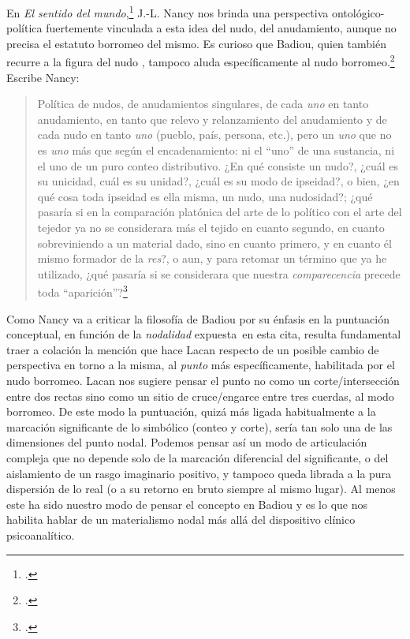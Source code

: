 En \emph{El sentido del mundo},\footcite{@7011-NANCY1993} J.-L. Nancy nos brinda una perspectiva ontológico-política fuertemente vinculada a esta idea del nudo, del anudamiento, aunque no precisa el estatuto borromeo del mismo. Es curioso que Badiou, quien también recurre a la figura del nudo , tampoco aluda específicamente al nudo borromeo.\footcite{@7072-BADIOU2002} Escribe Nancy:


\begin{quote}
Política de nudos, de anudamientos singulares, de cada \emph{uno} en tanto anudamiento, en tanto que relevo y relanzamiento del anudamiento y de cada nudo en tanto \emph{uno} (pueblo, país, persona, etc.), pero un \emph{uno} que no es \emph{uno} más que según el encadenamiento: ni el \enquote{uno} de una sustancia, ni el uno de un puro conteo distributivo. ¿En qué consiste un nudo?, ¿cuál es su unicidad, cuál es su unidad?, ¿cuál es su modo de ipseidad?, o bien, ¿en qué cosa toda ipseidad es ella misma, un nudo, una nudosidad?; ¿qué pasaría si en la comparación platónica del arte de lo político con el arte del tejedor ya no se considerara más el tejido en cuanto segundo, en cuanto sobreviniendo a un material dado, sino en cuanto primero, y en cuanto él mismo formador de la \emph{res}?, o aun, y para retomar un término que ya he utilizado, ¿qué pasaría si se considerara que nuestra \emph{comparecencia} precede toda \enquote{aparición}?\footcite[95]{@7012-NANCY2009}
\end{quote}

Como Nancy va a criticar la filosofía de Badiou por su énfasis en la puntuación conceptual, en función de la \emph{nodalidad} expuesta~en esta cita, resulta fundamental traer a colación la mención que hace Lacan respecto de un posible cambio de perspectiva en torno a la misma, al \emph{punto} más específicamente, habilitada por el nudo borromeo. Lacan nos sugiere pensar el punto no como un corte/intersección entre dos rectas sino como un sitio de cruce/engarce entre tres cuerdas, al modo borromeo. De este modo la puntuación, quizá más ligada habitualmente a la marcación significante de lo simbólico (conteo y corte), sería tan solo una de las dimensiones del punto nodal. Podemos pensar así un modo de articulación compleja que no depende solo de la marcación diferencial del significante, o del aislamiento de un rasgo imaginario positivo, y tampoco queda librada a la pura dispersión de lo real (o a su retorno en bruto siempre al mismo lugar). Al menos este ha sido nuestro modo de pensar el concepto en Badiou y es lo que nos habilita hablar de un materialismo nodal más allá del dispositivo clínico psicoanalítico.

